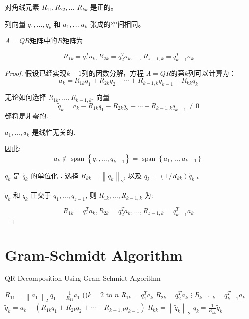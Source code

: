 \begin{corollary}
    对角线元素 $R_{11}, R_{22}, \ldots, R_{k k}$ 是正的。
\end{corollary}

\begin{corollary}
    列向量 $q_{1}, \ldots, q_{k}$ 和 $a_{1}, \ldots, a_{k}$ 张成的空间相同。
\end{corollary}

\begin{theorem}
$A = Q R$矩阵中的$R$矩阵为

    $$R_{1 k}=q_{1}^{T} a_{k},  R_{2 k}=q_{2}^{T} a_{k}, \ldots,  R_{k-1, k}=q_{k-1}^{T} a_{k}$$
\end{theorem}

\begin{proof}


    假设已经实现$k−1$列的因数分解，方程 $A= QR$的第$k$列可以计算为：
$$
a_{k}=R_{1 k} q_{1}+R_{2 k} q_{2}+\cdots+R_{k-1, k} q_{k-1}+R_{k k} q_{k}
$$

无论如何选择 $R_{1 k}, \ldots, R_{k-1, k}$, 向量
$$
\tilde{q}_{k}=a_{k}-R_{1 k} q_{1}-R_{2 k} q_{2}-\cdots-R_{k-1, k} q_{k-1} \neq 0
$$
都将是非零的.

$a_{1}, \ldots, a_{k}$ 是线性无关的.

因此:
$$
a_{k} \notin \operatorname{span}\left\{q_{1}, \ldots, q_{k-1}\right\}=\operatorname{span}\left\{a_{1}, \ldots, a_{k-1}\right\}
$$

$q_{k}$ 是 $\tilde{q}_{k}$ 的单位化：选择 $R_{k k}=\left\|\tilde{q}_{k}\right\|_{2}$, 以及 $q_{k}=\left(1 / R_{k k}\right) \tilde{q}_{k}$ 。 

$\tilde{q}_{k}$ 和 $q_{k}$ 正交于 $q_{1}, \ldots, q_{k-1}$, 则 $R_{1 k}, \ldots, R_{k-1, k}$ 为:

$$R_{1 k}=q_{1}^{T} a_{k},  R_{2 k}=q_{2}^{T} a_{k}, \ldots,  R_{k-1, k}=q_{k-1}^{T} a_{k}$$
\end{proof}

\section{Gram-Schmidt Algorithm}

\begin{algorithm}[htbp]
    \caption{QR Decomposition Using Gram-Schmidt Algorithm}

    $R_{11}=\left\|a_{1}\right\|_{2}$ \;
     $q_{1}=\frac{1}{R_{11}} a_{1}$ \;
\For(){$k=2$ to $n$}{
$R_{1 k} =q_{1}^{T} a_{k}$ \;
$R_{2 k} =q_{2}^{T} a_{k} $\;
 $\vdots$ \;
$R_{k-1, k} =q_{k-1}^{T} a_{k}$ \;
$\tilde{q}_{k} =a_{k}-\left(R_{1 k} q_{1}+R_{2 k} q_{2}+\cdots+R_{k-1, k} q_{k-1}\right)$ \;
$R_{k k} =\left\|\tilde{q}_{k}\right\|_{2}$ \;
 $q_{k} =\frac{1}{R_{k k}} \tilde{q}_{k}$ \;
}
\end{algorithm}


